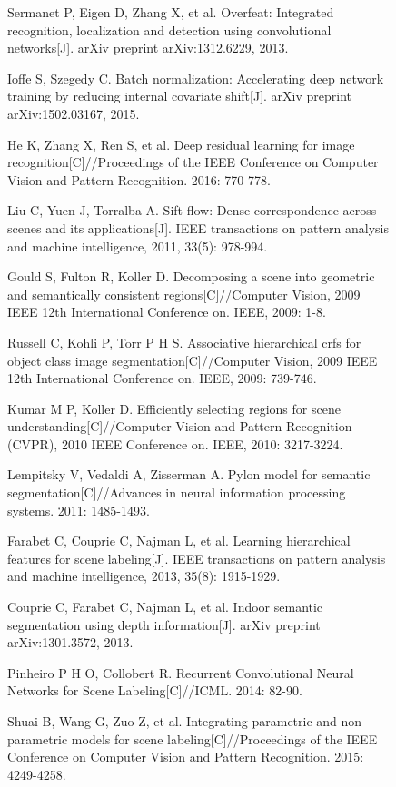 \documentclass[10.5pt,compsoc]{TsT}
\theoremstyle{mystyle}
\begin{document}
{\begin{figure}[t]
\begin{thebibliography}{99}
Sermanet P, Eigen D, Zhang X, et al. Overfeat: Integrated recognition, localization and detection using convolutional networks[J]. arXiv preprint arXiv:1312.6229, 2013.

Ioffe S, Szegedy C. Batch normalization: Accelerating deep network training by reducing internal covariate shift[J]. arXiv preprint arXiv:1502.03167, 2015.

He K, Zhang X, Ren S, et al. Deep residual learning for image recognition[C]//Proceedings of the IEEE Conference on Computer Vision and Pattern Recognition. 2016: 770-778.

Liu C, Yuen J, Torralba A. Sift flow: Dense correspondence across scenes and its applications[J]. IEEE transactions on pattern analysis and machine intelligence, 2011, 33(5): 978-994.

Gould S, Fulton R, Koller D. Decomposing a scene into geometric and semantically consistent regions[C]//Computer Vision, 2009 IEEE 12th International Conference on. IEEE, 2009: 1-8.


Russell C, Kohli P, Torr P H S. Associative hierarchical crfs for object class image segmentation[C]//Computer Vision, 2009 IEEE 12th International Conference on. IEEE, 2009: 739-746.

Kumar M P, Koller D. Efficiently selecting regions for scene understanding[C]//Computer Vision and Pattern Recognition (CVPR), 2010 IEEE Conference on. IEEE, 2010: 3217-3224.

Lempitsky V, Vedaldi A, Zisserman A. Pylon model for semantic segmentation[C]//Advances in neural information processing systems. 2011: 1485-1493.

Farabet C, Couprie C, Najman L, et al. Learning hierarchical features for scene labeling[J]. IEEE transactions on pattern analysis and machine intelligence, 2013, 35(8): 1915-1929.

Couprie C, Farabet C, Najman L, et al. Indoor semantic segmentation using depth information[J]. arXiv preprint arXiv:1301.3572, 2013.

Pinheiro P H O, Collobert R. Recurrent Convolutional Neural Networks for Scene Labeling[C]//ICML. 2014: 82-90.

Shuai B, Wang G, Zuo Z, et al. Integrating parametric and non-parametric models for scene labeling[C]//Proceedings of the IEEE Conference on Computer Vision and Pattern Recognition. 2015: 4249-4258.


\end{thebibliography}
\end{figure}}
\end{document}
